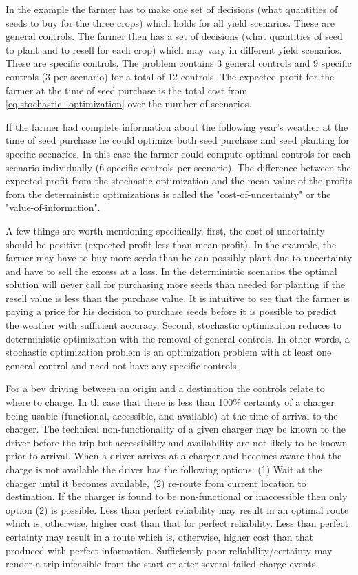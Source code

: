 \documentclass[12pt]{article}
\begin{document}
In the example the farmer has to make one set of decisions (what quantities of seeds to buy for the three crops) which holds for all yield scenarios. These are general controls. The farmer then has a set of decisions (what quantities of seed to plant and to resell for each crop) which may vary in different yield scenarios. These are specific controls. The problem contains 3 general controls and 9 specific controls (3 per scenario) for a total of 12 controls. The expected profit for the farmer at the time of seed purchase is the total cost from \eqref{eq:stochastic_optimization} over the number of scenarios.

If the farmer had complete information about the following year's weather at the time of seed purchase he could optimize both seed purchase and seed planting for specific scenarios. In this case the farmer could compute optimal controls for each scenario individually (6 specific controls per scenario). The difference between the expected profit from the stochastic optimization and the mean value of the profits from the deterministic optimizations is called the "cost-of-uncertainty" or the "value-of-information".

A few things are worth mentioning specifically. first, the cost-of-uncertainty should be positive (expected profit less than mean profit). In the example, the farmer may have to buy more seeds than he can possibly plant due to uncertainty and have to sell the excess at a loss. In the deterministic scenarios the optimal solution will never call for purchasing more seeds than needed for planting if the resell value is less than the purchase value. It is intuitive to see that the farmer is paying a price for his decision to purchase seeds before it is possible to predict the weather with sufficient accuracy. Second, stochastic optimization reduces to deterministic optimization with the removal of general controls. In other words, a stochastic optimization problem is an optimization problem with at least one general control and need not have any specific controls.

For a \gls{bev} driving between an origin and a destination the controls relate to where to charge. In th case that there is less than 100\% certainty of a charger being usable (functional, accessible, and available) at the time of arrival to the charger. The technical non-functionality of a given charger may be known to the driver before the trip but accessibility and availability are not likely to be known prior to arrival. When a driver arrives at a charger and becomes aware that the charge is not available the driver has the following options: (1) Wait at the charger until it becomes available, (2) re-route from current location to destination. If the charger is found to be non-functional or inaccessible then only option (2) is possible. Less than perfect reliability may result in an optimal route which is, otherwise, higher cost than that for perfect reliability. Less than perfect certainty may result in a route which is, otherwise, higher cost than that produced with perfect information. Sufficiently poor reliability/certainty may render a trip infeasible from the start or after several failed charge events.
\end{document}
